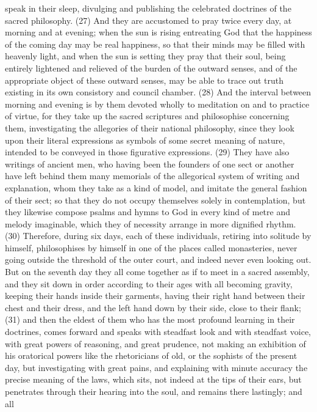 speak in their sleep, divulging and publishing the celebrated doctrines of the sacred philosophy.
(27) And they are accustomed to pray twice every day, at morning and at evening; when the sun is
rising entreating God that the happiness of the coming day may be real happiness, so that their
minds may be filled with heavenly light, and when the sun is setting they pray that their soul, being
entirely lightened and relieved of the burden of the outward senses, and of the appropriate object
of these outward senses, may be able to trace out truth existing in its own consistory and council
chamber. (28) And the interval between morning and evening is by them devoted wholly to
meditation on and to practice of virtue, for they take up the sacred scriptures and philosophise
concerning them, investigating the allegories of their national philosophy, since they look upon their
literal expressions as symbols of some secret meaning of nature, intended to be conveyed in
those figurative expressions. (29) They have also writings of ancient men, who having been the
founders of one sect or another have left behind them many memorials of the allegorical system of
writing and explanation, whom they take as a kind of model, and imitate the general fashion of their
sect; so that they do not occupy themselves solely in contemplation, but they likewise compose
psalms and hymns to God in every kind of metre and melody imaginable, which they of necessity
arrange in more dignified rhythm. (30) Therefore, during six days, each of these individuals, retiring
into solitude by himself, philosophises by himself in one of the places called monasteries, never
going outside the threshold of the outer court, and indeed never even looking out. But on the
seventh day they all come together as if to meet in a sacred assembly, and they sit down in order
according to their ages with all becoming gravity, keeping their hands inside their garments, having
their right hand between their chest and their dress, and the left hand down by their side, close to
their flank; (31) and then the eldest of them who has the most profound learning in their doctrines,
comes forward and speaks with steadfast look and with steadfast voice, with great powers of
reasoning, and great prudence, not making an exhibition of his oratorical powers like the
rhetoricians of old, or the sophists of the present day, but investigating with great pains, and
explaining with minute accuracy the precise meaning of the laws, which sits, not indeed at the tips
of their ears, but penetrates through their hearing into the soul, and remains there lastingly; and all
